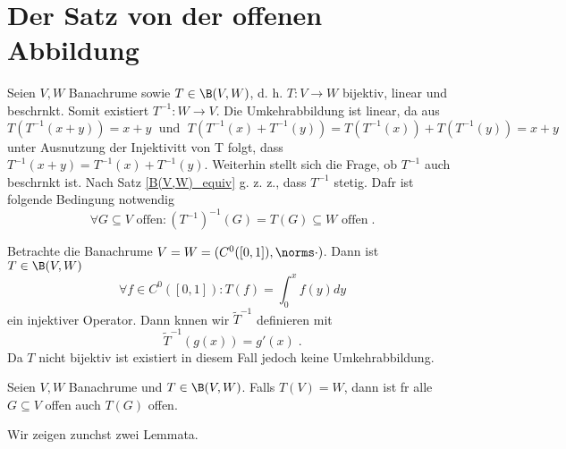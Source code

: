 \section{Der Satz von der offenen Abbildung}

\begin{rem}[Motivation]
	Seien \(V, W\) Banachr\as ume sowie \(T \in \B(V,W)\), d. h. \(T: V\to W\) bijektiv, linear und beschr\as nkt. Somit existiert \(T^{-1}:W\to V\). Die Umkehrabbildung ist linear, da aus
	\[T(T^{-1}(x+y)) = x +y \;\text{ und }\; T(T^{-1}(x) + T^{-1}(y)) = T(T^{-1}(x)) + T(T^{-1}(y)) = x + y\]
	unter Ausnutzung der Injektivit\as t von T folgt, dass \(T^{-1}(x+y) = T^{-1}(x) + T^{-1}(y)\). Weiterhin stellt sich die Frage, ob \(T^{-1}\) auch beschr\as nkt ist. Nach Satz \ref{B(V,W)_equiv} g. z. z., dass \(T^{-1}\) stetig. Daf\us r ist folgende Bedingung notwendig
	\[\forall G \subseteq V \text{ offen}: (T^{-1})^{-1} (G) = T(G) \subseteq W \text{ offen}\;.\]
\end{rem}
\begin{ex}
	Betrachte die Banachr\as ume \(V= W = (C^0([0,1]), \norms \cdot)\). Dann ist \(T\in \B(V,W)\)
	\[\forall f \in C^0([0,1]): T(f) = \int_0^x f(y)dy\]
	ein injektiver Operator. Dann k\os nnen wir \(\tilde T^{-1}\) definieren mit
	\[\tilde T^{-1} (g(x)) = g'(x)\;.\]
	Da \(T\) nicht bijektiv ist existiert in diesem Fall jedoch keine Umkehrabbildung.
\end{ex}

\begin{theorem}
	Seien \(V, W\) Banachr\as ume und \(T\in \B(V,W)\). Falls \(T(V) = W\), dann ist f\us r alle \(G\subseteq V\) offen auch \(T(G)\) offen.
	\label{Offene_Abb} \end{theorem}
Wir zeigen zun\as chst zwei Lemmata.

